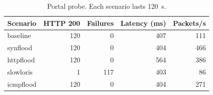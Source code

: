 \begin{table}[t]
\centering
\small
\caption{Portal probe. Each scenario lasts 120~s.}
\label{tbl:sonda}
\setlength{\tabcolsep}{4pt}
\begin{tabular}{@{}lrrrr@{}}
\toprule
Scenario & HTTP 200 & Failures & Latency (ms) & Packets/s \\
\midrule
baseline & 120 & 0 & 407 & 111 \\
synflood & 120 & 0 & 404 & 466 \\
httpflood & 120 & 0 & 564 & 386 \\
slowloris & 1 & 117 & 403 & 86 \\
icmpflood & 120 & 0 & 404 & 271 \\
\bottomrule
\end{tabular}
\end{table}
